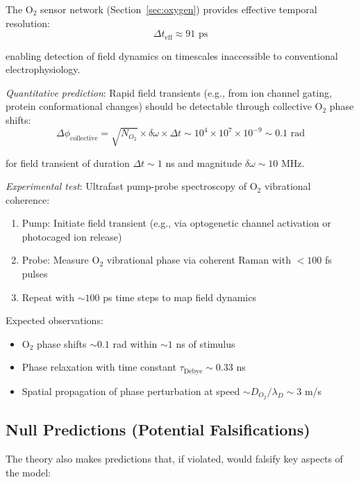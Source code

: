 \documentclass[twocolumn,10pt,aps,prd,superscriptaddress,floatfix,nofootinbib]{revtex4-2}
\theoremstyle{remark}
\begin{document}
The O$_2$ sensor network (Section~\ref{sec:oxygen}) provides effective temporal resolution:
\begin{equation}
\Delta t_{\mathrm{eff}} \approx 91 \text{ ps}
\end{equation}

enabling detection of field dynamics on timescales inaccessible to conventional electrophysiology.

\textit{Quantitative prediction}: Rapid field transients (e.g., from ion channel gating, protein conformational changes) should be detectable through collective O$_2$ phase shifts:
\begin{equation}
\Delta\phi_{\mathrm{collective}} = \sqrt{N_{O_2}} \times \delta\omega \times \Delta t \sim 10^4 \times 10^7 \times 10^{-9} \sim 0.1 \text{ rad}
\end{equation}

for field transient of duration $\Delta t \sim 1$ ns and magnitude $\delta\omega \sim 10$ MHz.

\textit{Experimental test}: Ultrafast pump-probe spectroscopy of O$_2$ vibrational coherence:
\begin{enumerate}
\item Pump: Initiate field transient (e.g., via optogenetic channel activation or photocaged ion release)
\item Probe: Measure O$_2$ vibrational phase via coherent Raman with $<100$ fs pulses
\item Repeat with $\sim 100$ ps time steps to map field dynamics
\end{enumerate}

Expected observations:
\begin{itemize}
\item O$_2$ phase shifts $\sim 0.1$ rad within $\sim 1$ ns of stimulus
\item Phase relaxation with time constant $\tau_{\mathrm{Debye}} \sim 0.33$ ns
\item Spatial propagation of phase perturbation at speed $\sim D_{O_2}/\lambda_D \sim 3$ m/s
\end{itemize}

\subsection{Null Predictions (Potential Falsifications)}

The theory also makes predictions that, if violated, would falsify key aspects of the model:
\end{document}
